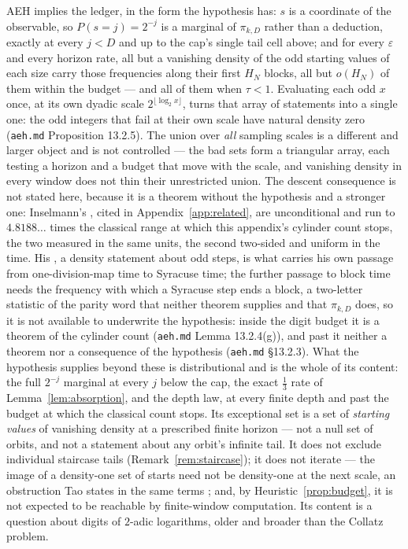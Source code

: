 \documentclass[11pt]{article}
\theoremstyle{remark}
\begin{document}
AEH implies the ledger, in the form the hypothesis has: $s$ is a coordinate of
the observable, so $P(s = j) = 2^{-j}$ is a marginal of $\pi_{k,D}$ rather than a
deduction, exactly at every $j < D$ and up to the cap's single tail cell above;
and for every $\varepsilon$ and every horizon rate, all but a vanishing density of
the odd starting values of each size carry those frequencies along their first
$H_N$ blocks, all but $o(H_N)$ of them within the budget --- and all of them when
$\tau < 1$. Evaluating
each odd $x$ once, at its own dyadic scale $2^{\lfloor \log_2 x\rfloor}$, turns
that array of statements into a single one: the odd integers that fail at their
own scale have natural density zero (\texttt{aeh.md} Proposition 13.2.5). The
union over \emph{all} sampling scales is a different and larger object and is not
controlled --- the bad sets form a triangular array, each testing a horizon and a
budget that move with the scale, and vanishing density in every window does not
thin their unrestricted union. The
descent consequence is not stated here, because it is a theorem without the
hypothesis and a stronger one: Inselmann's \cite[Cor.~1.4, Thm.~1.10]{inselmann},
cited in Appendix~\ref{app:related}, are unconditional and run to $4.8188\ldots$ times the
classical range at which this appendix's cylinder count stops, the two measured in
the same units, the second two-sided and uniform in the time. His
\cite[Thm.~1.6]{inselmann}, a density statement about odd steps, is what
carries his own passage from one-division-map time to Syracuse time; the further passage to
block time needs the frequency with which a Syracuse step ends a block, a
two-letter statistic of the parity word that neither theorem supplies and that
$\pi_{k,D}$ does, so it is not available to underwrite the hypothesis: inside the
digit budget it is a theorem of the cylinder count (\texttt{aeh.md}
Lemma 13.2.4(g)), and past it neither a theorem nor a consequence of the hypothesis
(\texttt{aeh.md} \S13.2.3). What the hypothesis supplies beyond these is
distributional and is the whole of its content: the full $2^{-j}$ marginal at every
$j$ below the cap, the exact $\tfrac13$ rate of Lemma~\ref{lem:absorption}, and the
depth law, at every finite depth and past the budget at which the classical count
stops. Its exceptional set is a set of \emph{starting values} of vanishing density
at a prescribed finite horizon --- not a null set of orbits, and not a statement
about any orbit's infinite tail. It does not exclude individual staircase tails
(Remark~\ref{rem:staircase}); it does not iterate --- the image of a density-one set
of starts need not be density-one at the next scale, an obstruction Tao states in the
same terms \cite{tao}; and, by Heuristic~\ref{prop:budget}, it is not expected to be
reachable by finite-window computation. Its content is a question about digits of $2$-adic
logarithms, older and broader than the Collatz problem.
\end{document}
